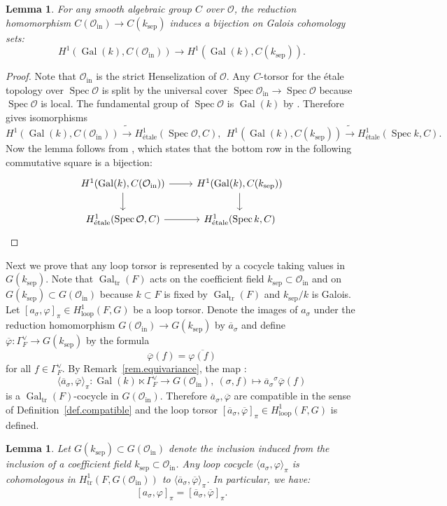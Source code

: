 \documentclass[12pt]{amsart}
\numberwithin{equation}{section}
\newtheorem{lemma}[theorem]{Lemma}
\theoremstyle{definition}
\newcommand{\cO}{\mathcal{O}}
\newcommand{\et}{\text{\'etale}}
\newcommand{\Gal}{\operatorname{Gal}}
\newcommand{\Spec}{\operatorname{Spec}}
\newcommand{\sep}{\operatorname{sep}}
\newcommand{\tr}{\operatorname{tr}}
\newcommand{\ksep}{k_{\sep}}
\newcommand{\oin}{\operatorname{in}}
\newcommand{\Oin}{\cO_{\oin}}
\newcommand{\vphi}{\varphi}
\newcommand{\Galtr}{\Gal_{\tr}}
\newcommand{\I}[1]{\Gamma_{#1}^{\vee}}
\newcommand{\lop}{\operatorname{loop}}
\begin{document}
\begin{lemma}\label{lem.bijectivity_passing_special_fiber}
    For any smooth algebraic group $C$ over $\cO$, the reduction homomorphism $C(\Oin)\to C(\ksep)$ induces a bijection on Galois cohomology sets:
    $$H^1(\Gal(k),C(\Oin))\to H^1(\Gal(k),C(\ksep)).$$
\end{lemma}
\begin{proof}
    Note that $\Oin$ is the strict Henselization of $\cO$. Any $C$-torsor for the \'etale topology over $\Spec\cO$ is split by the universal cover $\Spec\Oin \to \Spec\cO$ because $\Spec \cO$ is local. The fundamental group of $\Spec \cO$ is $\Gal(k)$ by \cite[Section 5, Example 5.2.d]{milne1980etale}. Therefore \cite[Section 2.2]{gille2016classification} gives isomorphisms  $$H^1(\Gal(k),C(\Oin))\tilde{\to} H^1_{\et}(\Spec\cO,C),\  \ H^1(\Gal(k),C(\ksep)) \tilde{\to} H^1_{\et}(\Spec k,C).$$ 
    Now the  lemma follows from \cite[Expose XXIV,Proposition 8.1]{SGA3}, which states that the bottom row in the following commutative square is a bijection:
\[\begin{tikzcd}
	{H^1(\Gal(k),C(\Oin))} & {H^1(\Gal(k),C(\ksep))} \\
	{H^1_{\et}(\Spec \cO, C)} & {H^1_{\et}(\Spec k,C)}
	\arrow[from=2-1, to=2-2]
	\arrow[from=1-1, to=2-1]
	\arrow[from=1-2, to=2-2]
	\arrow[from=1-1, to=1-2]
\end{tikzcd}\]
\end{proof}

Next we prove that any loop torsor is represented by a cocycle taking values in $G(\ksep)$. Note that $\Galtr(F)$ acts on the coefficient field $\ksep\subset \Oin$ and on $G(\ksep)\subset G(\Oin)$ because $k\subset F$ is fixed by $\Galtr(F)$ and $\ksep/k$ is Galois. Let $[a_\sigma,\vphi]_\pi \in H^1_{\lop}(F,G)$ be a loop torsor. Denote the images of $a_\sigma$ under the reduction homomorphism $G(\Oin)\to G(\ksep)$ by $\overline{a}_\sigma$ and define $\overline{\vphi}:\I{F}\to G(\ksep)$ by the formula
$$\overline{\vphi}(f) = \overline{\vphi(f)}$$
for all $f\in \I{F}$. By Remark~\ref{rem.equivariance}, the map :
$$\langle \overline{a}_\sigma,\overline{\vphi}\rangle_\pi: \Gal(k)\ltimes \I{F} \to G(\Oin), \  (\sigma,f) \mapsto \overline{a}_\sigma {}^\sigma \overline{\vphi}(f)$$
is a $\Galtr(F)$-cocycle in $G(\Oin)$. Therefore $\overline{a}_\sigma,\overline{\vphi}$ are compatible in the sense of Definition~\ref{def.compatible} and the loop torsor $[\overline{a}_\sigma,\overline{\vphi}]_\pi\in H^1_{\lop}(F,G)$ is defined. 
\begin{lemma}\label{lem.Hensel_coefficient_field}
    Let $G(\ksep)\subset G(\Oin)$ denote the inclusion induced from the inclusion of a coefficient field $\ksep\subset \Oin$. Any loop cocycle $\langle a_\sigma, \vphi\rangle_\pi$ is cohomologous in $H^1_{\tr}(F,G(\Oin))$ to $\langle \overline{a}_\sigma,\overline{\vphi}\rangle_\pi$. In particular, we have:
    $$[a_\sigma,\vphi]_\pi = [\overline{a}_\sigma,\overline{\vphi}]_\pi.$$
\end{lemma}
\end{document}
